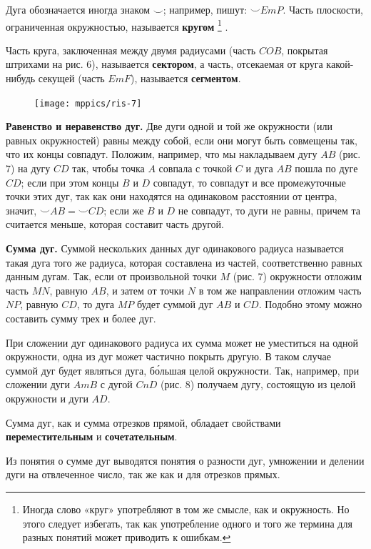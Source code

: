\documentclass[oneside]{book}
\begin{document}
Дуга обозначается иногда знаком $\smallsmile$;
например, пишут: ${\smallsmile} EmP$.
Часть плоскости, ограниченная окружностью, называется \textbf{кругом}%
\footnote{Иногда слово «круг» употребляют в том же смысле, как и окружность.
Но этого следует избегать, так как употребление одного и того же термина для разных понятий может приводить к ошибкам.}%
.

Часть круга, заключенная между двумя радиусами (часть $COB$, покрытая штрихами на рис. 6), называется \textbf{сектором}, а часть, отсекаемая от круга какой-нибудь секущей (часть $EmF$), называется \textbf{сегментом}.

\begin{figure}
\texttt{[image: mppics/ris-7]}
\caption{}
\end{figure}

\textbf{Равенство и неравенство дуг.}
Две дуги одной и той же окружности (или равных окружностей) равны между собой, если они могут быть совмещены так, что их концы совпадут.
Положим, например, что мы накладываем дугу $AB$ (рис. 7) на дугу $CD$ так, чтобы точка $A$ совпала с точкой $C$ и дуга $AB$ пошла по дуге $CD$;
если при этом концы $B$ и $D$ совпадут, то совпадут и все промежуточные точки этих дуг, так как они находятся на одинаковом расстоянии от центра, значит, ${\smallsmile} AB={\smallsmile} CD$;
если же $B$ и $D$ не совпадут, то дуги не равны, причем та считается меньше, которая составит часть другой.

\textbf{Сумма дуг.}
Суммой нескольких данных дуг одинакового радиуса называется такая дуга того же радиуса, которая составлена из частей, соответственно равных данным дугам.
Так, если от произвольной точки $M$ (рис. 7) окружности отложим часть $MN$, равную $AB$, и затем от точки $N$ в том же направлении отложим часть $NP$, равную $CD$, то дуга $MP$ будет суммой дуг $AB$ и $CD$.
Подобно этому можно составить сумму трех и более дуг.

При сложении дуг одинакового радиуса их сумма может не уместиться на одной окружности, одна из дуг может частично покрыть другую.
В таком случае суммой дуг будет являться дуга, б\'{о}льшая целой окружности.
Так, например, при сложении дуги $AmB$ с дугой $CnD$ (рис. 8) получаем дугу, состоящую из целой окружности и дуги $AD$.

Сумма дуг, как и сумма отрезков прямой, обладает свойствами \textbf{переместительным} и \textbf{сочетательным}.

Из понятия о сумме дуг выводятся понятия о разности дуг, умножении и делении дуги на отвлеченное число, так же как и для отрезков прямых.
\end{document}
